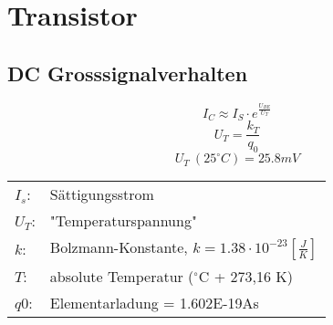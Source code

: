 



\newpage
\section{Transistor}
\subsection{DC Grosssignalverhalten}

\[ I_C \approx I_S \cdot e^{\frac{U_{BE}}{U_T}}\]
\[ U_T= \frac{k_T}{q_0} \]
\[ U_T~(25^\circ C) = 25.8 mV \]

\begin{tabular}{@{}ll}
  $I_s$:        & Sättigungsstrom \\
                
  $U_T$:	    & "Temperaturspannung" \\
  $k$:          & Bolzmann-Konstante, $k=1.38 \cdot 10^{-23} [\frac{J}{K}]$ \\
  $T$:          & absolute Temperatur ($^\circ$C + 273,16 K) \\
  $q0$:         & Elementarladung = 1.602E-19As \\
                
\end{tabular}
